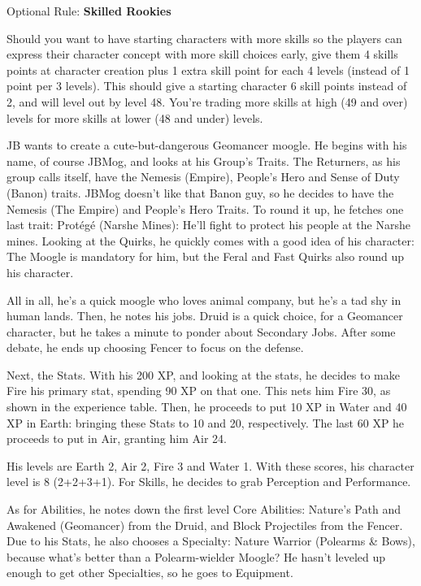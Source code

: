 \clearpage
{\centering%
}
{\color{bocoblue}\small%
Optional Rule: \textbf{Skilled Rookies}

Should you want to have starting characters with more skills so the players can express their character concept with more skill choices early, give them 4 skills points at character creation plus 1 extra skill point for each 4 levels (instead of 1 point per 3 levels). This should give a starting character 6 skill points instead of 2, and will level out by level 48. You're trading more skills at high (49 and over) levels for more skills at lower (48 and under) levels.%
}

\begin{multimog}
JB wants to create a cute-but-dangerous Geomancer moogle. He begins with his name, of course JBMog, and looks at his Group's Traits. The Returners, as his group calls itself, have the Nemesis (Empire), People's Hero and Sense of Duty (Banon) traits. JBMog doesn't like that Banon guy, so he decides to have the Nemesis (The Empire) and People's Hero Traits. To round it up, he fetches one last trait: Protégé (Narshe Mines): He'll fight to protect his people at the Narshe mines. Looking at the Quirks, he quickly comes with a good idea of his character: The Moogle is mandatory for him, but the Feral and Fast Quirks also round up his character.

All in all, he's a quick moogle who loves animal company, but he's a tad shy in human lands. Then, he notes his jobs. Druid is a quick choice, for a Geomancer character, but he takes a minute to ponder about Secondary Jobs. After some debate, he ends up choosing Fencer to focus on the defense.

Next, the Stats. With his 200 XP, and looking at the stats, he decides to make Fire his primary stat, spending 90 XP on that one. This nets him Fire 30, as shown in the experience table. Then, he proceeds to put 10 XP in Water and 40 XP in Earth: bringing these Stats to 10 and 20, respectively. The last 60 XP he proceeds to put in Air, granting him Air 24.

His levels are Earth 2, Air 2, Fire 3 and Water 1. With these scores, his character level is 8 (2+2+3+1). For Skills, he decides to grab Perception and Performance.

As for Abilities, he notes down the first level Core Abilities: Nature's Path and Awakened (Geomancer) from the Druid, and Block Projectiles from the Fencer. Due to his Stats, he also chooses a Specialty: Nature Warrior (Polearms \& Bows), because what’s better than a Polearm-wielder Moogle? He hasn't leveled up enough to get other Specialties, so he goes to Equipment.


\end{multimog}
